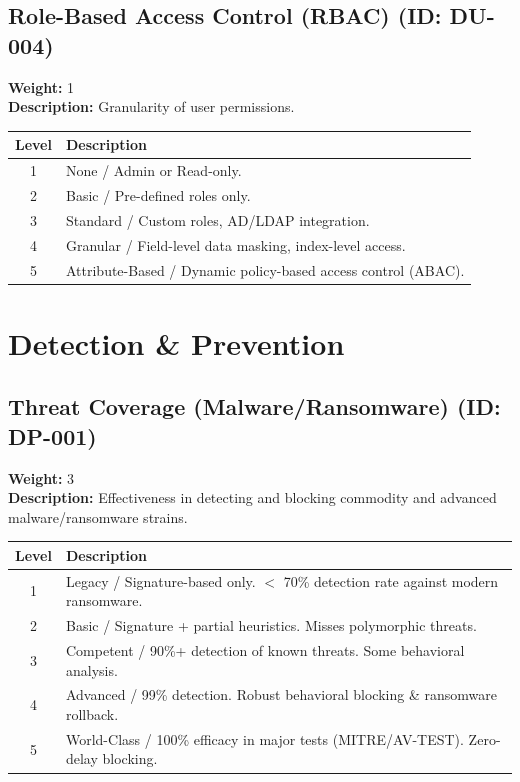 \documentclass{article}
\begin{document}
\subsection{Role-Based Access Control (RBAC) (ID: DU-004)}
\textbf{Weight:} 1 \\
\textbf{Description:} Granularity of user permissions.
\vspace{0.3cm}
\begin{longtable}{|c|p{12cm}|}
\hline
\rowcolor{lightgray} \textbf{Level} & \textbf{Description} \\ \hline
1 & None / Admin or Read-only. \\ \hline
2 & Basic / Pre-defined roles only. \\ \hline
3 & Standard / Custom roles, AD/LDAP integration. \\ \hline
4 & Granular / Field-level data masking, index-level access. \\ \hline
5 & Attribute-Based / Dynamic policy-based access control (ABAC). \\ \hline
\end{longtable}
\vspace{0.5cm}
\section{Detection \& Prevention}
\subsection{Threat Coverage (Malware/Ransomware) (ID: DP-001)}
\textbf{Weight:} 3 \\
\textbf{Description:} Effectiveness in detecting and blocking commodity and advanced malware/ransomware strains.
\vspace{0.3cm}
\begin{longtable}{|c|p{12cm}|}
\hline
\rowcolor{lightgray} \textbf{Level} & \textbf{Description} \\ \hline
1 & Legacy / Signature-based only. $<$ 70\% detection rate against modern ransomware. \\ \hline
2 & Basic / Signature + partial heuristics. Misses polymorphic threats. \\ \hline
3 & Competent / 90\%+ detection of known threats. Some behavioral analysis. \\ \hline
4 & Advanced / 99\% detection. Robust behavioral blocking \& ransomware rollback. \\ \hline
5 & World-Class / 100\% efficacy in major tests (MITRE/AV-TEST). Zero-delay blocking. \\ \hline
\end{longtable}
\vspace{0.5cm}
\end{document}
